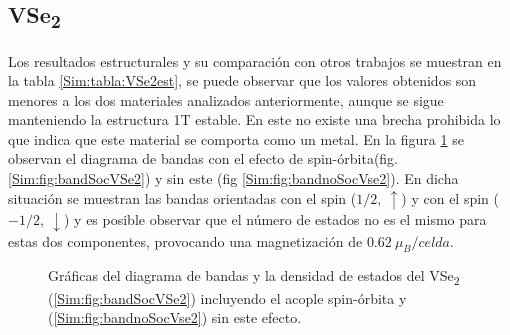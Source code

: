 \subsection{VSe\textsubscript{2}} \label{Sim:subsec:vse2cU}
Los resultados estructurales y su comparaci\'on con otros trabajos se muestran en la tabla \ref{Sim:tabla:VSe2est}, se puede observar que los valores obtenidos son menores a los dos materiales analizados anteriormente, aunque se sigue manteniendo la estructura 1T estable. En este no existe una brecha prohibida  lo que indica que este material  se comporta como un metal. En la figura \ref{Sim:fig:bandasVSe2} se observan el diagrama de bandas con el efecto de spin-\'orbita(fig. \ref{Sim:fig:bandSocVSe2}) y sin este (fig \ref{Sim:fig:bandnoSocVse2}). En dicha situación  se muestran las bandas orientadas con el spin ($1/2,~ \uparrow$) y con el spin ($-1/2,~ \downarrow$) y es posible observar que el n\'umero de estados no es el mismo para estas dos componentes,  provocando una magnetizaci\'on de $0.62~ \mu_B / celda$.
\begin{figure}[!hbt]
	\centering
	\caption[Diagrama de bandas y densidad de estados de la celda unitaria del VSe\textsubscript{2}.]{Gr\'aficas del diagrama de bandas y la densidad de estados del VSe\textsubscript{2} (\ref{Sim:fig:bandSocVSe2}) incluyendo el acople spin-\'orbita y (\ref{Sim:fig:bandnoSocVse2}) sin este efecto.}
	\label{Sim:fig:bandasVSe2}
\end{figure}
